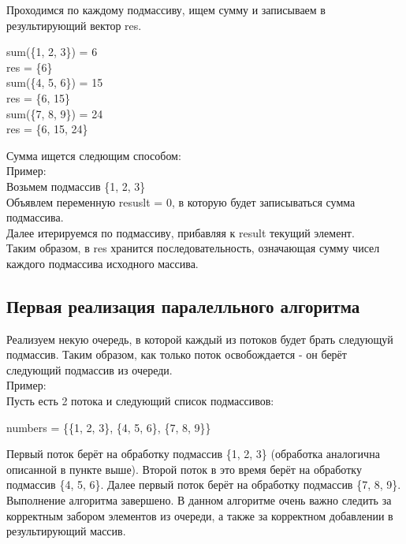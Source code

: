 \documentclass[12pt,a4paper]{article}
\numberwithin{equation}{section}
\begin{document}
Проходимся по каждому подмассиву, ищем сумму и записываем в результирующий вектор res.
\begin{center}
sum(\{1, 2, 3\}) = 6\\
res = \{6\}\\
sum(\{4, 5, 6\}) = 15\\
res = \{6, 15\}\\
sum(\{7, 8, 9\}) = 24\\
res = \{6, 15, 24\}\\
\end{center}

Сумма ищется следющим способом:\\
Пример:\\
Возьмем подмассив \{1, 2, 3\}\\
Объявлем переменную resuslt = 0, в которую будет записываться сумма подмассива.\\
Далее итерируемся по подмассиву, прибавляя к result текущий элемент.\\

Таким образом, в res хранится последовательность, означающая сумму чисел каждого подмассива исходного массива.

\subsection{Первая реализация паралелльного алгоритма}
Реализуем некую очередь, в которой каждый из потоков будет брать следующуй подмассив. Таким образом, как только поток освобождается - он берёт следующий подмассив из очереди.\\
Пример: \\
Пусть есть 2 потока и следующий список подмассивов:
\begin{center}
	numbers = \{\{1, 2, 3\}, \{4, 5, 6\}, \{7, 8, 9\}\}
\end{center}
Первый поток берёт на обработку подмассив \{1, 2, 3\} (обработка аналогична описанной в пункте выше). Второй поток в это время берёт на обработку подмассив \{4, 5, 6\}. Далее первый поток берёт на обработку подмассив  \{7, 8, 9\}. Выполнение алгоритма завершено. В данном алгоритме очень важно следить за корректным забором элементов из очереди, а также за корректном добавлении в результирующий массив.
\end{document}
